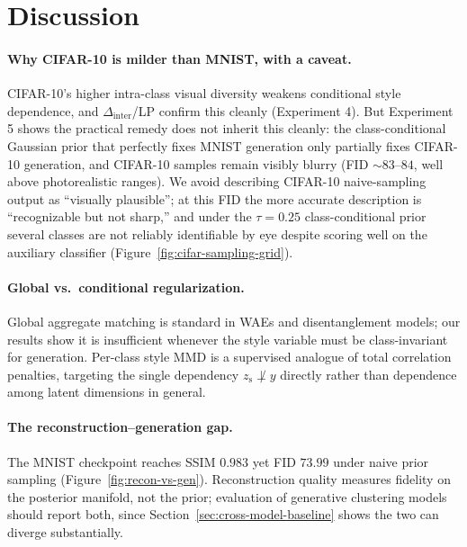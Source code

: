 \documentclass[10pt,letterpaper]{article}
\newcommand{\zs}{z_{\mathrm{s}}}
\begin{document}
\section{Discussion}
\label{sec:discussion}

\paragraph{Why CIFAR-10 is milder than MNIST, with a caveat.}
CIFAR-10's higher intra-class visual diversity weakens conditional style
dependence, and $\Delta_{\mathrm{inter}}$/LP confirm this cleanly
(Experiment 4). But Experiment 5 shows the practical remedy does not
inherit this cleanly: the class-conditional Gaussian prior that perfectly
fixes MNIST generation only partially fixes CIFAR-10 generation, and
CIFAR-10 samples remain visibly blurry (FID $\sim\!83$--$84$, well above
photorealistic ranges). We avoid describing CIFAR-10 naive-sampling output
as ``visually plausible''; at this FID the more accurate description is
``recognizable but not sharp,'' and under the $\tau{=}0.25$
class-conditional prior several classes are not reliably identifiable by
eye despite scoring well on the auxiliary classifier
(Figure~\ref{fig:cifar-sampling-grid}).

\paragraph{Global vs.\ conditional regularization.}
Global aggregate matching is standard in WAEs and disentanglement models;
our results show it is insufficient whenever the style variable must be
class-invariant for generation. Per-class style MMD is a supervised
analogue of total correlation penalties, targeting the single dependency
$\zs\not\perp y$ directly rather than dependence among latent dimensions in
general.

\paragraph{The reconstruction--generation gap.}
The MNIST checkpoint reaches SSIM $0.983$ yet FID $73.99$ under naive prior
sampling (Figure~\ref{fig:recon-vs-gen}). Reconstruction quality measures
fidelity on the posterior manifold, not the prior; evaluation of generative
clustering models should report both, since Section~\ref{sec:cross-model-baseline}
shows the two can diverge substantially.
\end{document}
